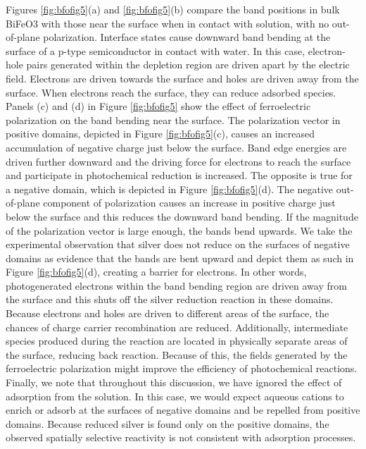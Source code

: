 \documentclass[12pt,%
              twoside,
               letterpaper]{uiothesis}
\begin{document}
Figures \ref{fig:bfofig5}(a) and \ref{fig:bfofig5}(b) compare the band positions in bulk
BiFeO3 with those near the surface when in contact with solution, with no
out-of-plane polarization. Interface states cause downward band bending at the surface of
a p-type semiconductor in contact with water.\cite{Morrison:1980va} In this case,
electron-hole pairs generated within the depletion region are driven apart by the electric
field. Electrons are driven towards the surface and holes are driven away from the
surface. When electrons reach the surface, they can reduce adsorbed species. Panels (c)
and (d) in Figure \ref{fig:bfofig5} show the effect of ferroelectric polarization on the
band bending near the surface. The polarization vector in positive domains, depicted in
Figure \ref{fig:bfofig5}(c), causes an increased accumulation of negative charge just
below the surface. Band edge energies are driven further downward and the driving force
for electrons to reach the surface and participate in photochemical reduction is
increased. The opposite is true for a negative domain, which is depicted in Figure
\ref{fig:bfofig5}(d). The negative out-of-plane component of polarization causes an
increase in positive charge just below the surface and this reduces the downward band
bending. If the magnitude of the polarization vector is large enough, the bands bend
upwards. We take the experimental observation that silver does not reduce on the surfaces
of negative domains as evidence that the bands are bent upward and depict them as such in
Figure \ref{fig:bfofig5}(d), creating a barrier for electrons. In other words,
photogenerated electrons within the band bending region are driven away from the surface
and this shuts off the silver reduction reaction in these domains. Because electrons and
holes are driven to different areas of the surface, the chances of charge carrier
recombination are reduced. Additionally, intermediate species produced during the reaction
are located in physically separate areas of the surface, reducing back reaction. Because
of this, the fields generated by the ferroelectric polarization might improve the
efficiency of photochemical reactions. Finally, we note that throughout this discussion,
we have ignored the effect of adsorption from the solution. In this case, we would expect
aqueous  cations to enrich or adsorb at the surfaces of negative domains and be
repelled from positive domains. Because reduced silver is found only on the positive
domains, the observed spatially selective reactivity is not consistent with adsorption
processes.
\end{document}
